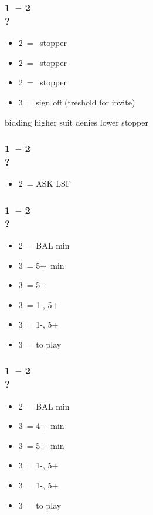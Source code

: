 \documentclass[12pt, a4paper]{article}
\begin{document}
\subsubsection*{1\diams\ -- 2\diams \\ ?}
\begin{itemize}
    \item 2\hearts\ = \hearts\ stopper
    \item 2\spades\ = \spades\ stopper
    \item 2\nt\ = \clubs\ stopper
    \item 3\clubs\ = sign off (treshold for invite)
\end{itemize}

bidding higher suit denies lower stopper

\subsubsection*{1\minor\ -- 2\hearts \\ ?}
\begin{itemize}
    \item 2\nt\ = ASK LSF
\end{itemize}

\subsubsection*{1\clubs\ -- 2\spades \\ ?}
\begin{itemize}
    \item 2\nt\ = BAL min
    \item 3\clubs\ = 5+\clubs\ min
    \item 3\diams\ = 5+\diams\ \gf
    \item 3\hearts\ = 1-\hearts, 5+\clubs\ \gf
    \item 3\spades\ = 1-\spades, 5+\clubs\ \gf
    \item 3\nt\ = to play
\end{itemize}

\subsubsection*{1\diams\ -- 2\spades \\ ?}
\begin{itemize}
    \item 2\nt\ = BAL min
    \item 3\clubs\ = 4+\clubs\ min
    \item 3\diams\ = 5+\diams\ min
    \item 3\hearts\ = 1-\hearts, 5+\diams\ \gf
    \item 3\spades\ = 1-\spades, 5+\diams\ \gf
    \item 3\nt\ = to play
\end{itemize}
\end{document}
